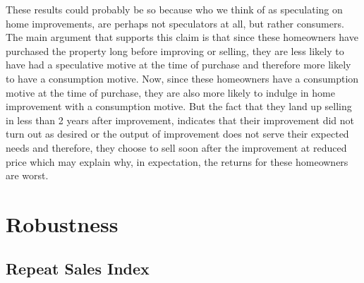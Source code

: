 \documentclass[AEJ,reqno, draftmode]{AEA} %
\begin{document}
These results could probably be so because who we think of as speculating on home improvements, are perhaps not speculators at all, but rather consumers. The main argument that supports this claim is that since these homeowners have purchased the property long before improving or selling, they are less likely to have had a speculative motive at the time of purchase and therefore more likely to have a consumption motive. Now, since these homeowners have a consumption motive at the time of purchase, they are also more likely to indulge in home improvement with a consumption motive. But the fact that they land up selling in less than 2 years after improvement, indicates that their improvement did not turn out as desired or the output of improvement does not serve their expected needs and therefore, they choose to sell soon after the improvement at reduced price which may explain why, in expectation, the returns for these homeowners are worst.


\restoregeometry

%
%

%
%
%
%
%
%

\section{Robustness}

\subsection{Repeat Sales Index}
\end{document}
